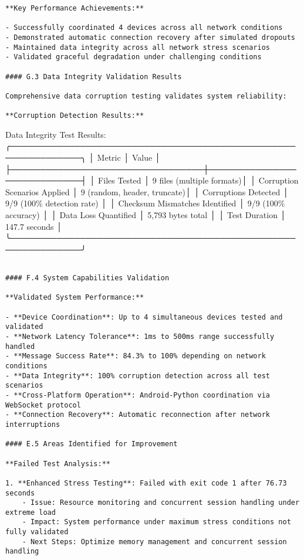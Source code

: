 \documentclass[11pt,a4paper]{article}
\begin{document}
{{\begin{verbatim}
**Key Performance Achievements:**

- Successfully coordinated 4 devices across all network conditions
- Demonstrated automatic connection recovery after simulated dropouts
- Maintained data integrity across all network stress scenarios
- Validated graceful degradation under challenging conditions

#### G.3 Data Integrity Validation Results

Comprehensive data corruption testing validates system reliability:

**Corruption Detection Results:**

\end{verbatim}
Data Integrity Test Results:
╭──────────────────────────────────────────────────────────────╮
│ Metric                          │ Value                      │
├─────────────────────────────────┼────────────────────────────┤
│ Files Tested                    │ 9 files (multiple formats)│
│ Corruption Scenarios Applied    │ 9 (random, header, truncate)│
│ Corruptions Detected           │ 9/9 (100\% detection rate) │
│ Checksum Mismatches Identified │ 9/9 (100\% accuracy)       │
│ Data Loss Quantified           │ 5,793 bytes total          │
│ Test Duration                   │ 147.7 seconds             │
╰──────────────────────────────────────────────────────────────╯
\begin{verbatim}

#### F.4 System Capabilities Validation

**Validated System Performance:**

- **Device Coordination**: Up to 4 simultaneous devices tested and validated
- **Network Latency Tolerance**: 1ms to 500ms range successfully handled
- **Message Success Rate**: 84.3% to 100% depending on network conditions
- **Data Integrity**: 100% corruption detection across all test scenarios
- **Cross-Platform Operation**: Android-Python coordination via WebSocket protocol
- **Connection Recovery**: Automatic reconnection after network interruptions

#### E.5 Areas Identified for Improvement

**Failed Test Analysis:**

1. **Enhanced Stress Testing**: Failed with exit code 1 after 76.73 seconds
    - Issue: Resource monitoring and concurrent session handling under extreme load
    - Impact: System performance under maximum stress conditions not fully validated
    - Next Steps: Optimize memory management and concurrent session handling


\end{verbatim}}}
\end{document}

